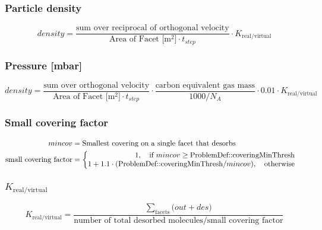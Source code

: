 \subsubsection*{Particle density}
\begin{equation}
	\label{eq:density}
	density=\frac{\text{sum over reciprocal of orthogonal velocity}}{\text{Area of Facet [m$^2$]} \cdot t_{step}} \cdot K_{\text{real}/\text{virtual}}
\end{equation}

\subsubsection*{Pressure [mbar]}
\begin{equation}
	\label{eq:pressure}
	density=\frac{\text{sum over orthogonal velocity}}{\text{Area of Facet [m$^2$]} \cdot t_{step}} \cdot \frac{\text{carbon equivalent gas mass}}{1000/N_A} \cdot 0.01 \cdot K_{\text{real}/\text{virtual}}
\end{equation}

\subsubsection*{Small covering factor}
\begin{equation}
	\label{eq:smallcov}
	\begin{split}
	mincov&=\text{Smallest covering on a single facet that desorbs}\\
	\text{small covering factor}&=
	\begin{cases}
		\begin{split}
		1,  \text{\quad if}\ mincov \geq \text{ProblemDef::coveringMinThresh}\\
		1+1.1 \cdot (\text{ProblemDef::coveringMinThresh}/mincov), \text{\quad otherwise}\\
		\end{split}
	\end{cases}
	\end{split}
\end{equation}

\subsubsection*{$K_{\text{real}/\text{virtual}}$}
\begin{equation}
	\label{eq:krealvirt}
	K_{\text{real}/\text{virtual}}=\frac{\sum\limits_{\text{facets}}\Big(out + des\Big)}{\text{number of total desorbed molecules/small covering factor}}
\end{equation}

